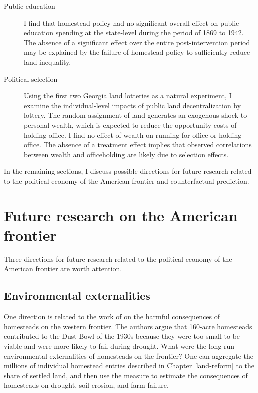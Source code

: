 \begin{description}
	\item[Public education] I find that homestead policy had no significant overall effect on public education spending at the state-level during the period of 1869 to 1942. The absence of a significant effect over the entire post-intervention period may be explained by the failure of homestead policy to sufficiently reduce land inequality. 
	
	\item[Political selection] Using the first two Georgia land lotteries as a natural experiment, I examine the individual-level impacts of public land decentralization by lottery. The random assignment of land generates an exogenous shock to personal wealth, which is expected to reduce the opportunity costs of holding office. I find no effect of wealth on running for office or holding office. The absence of a treatment effect implies that observed  correlations between wealth and officeholding are likely due to selection effects.
	
\end{description}

In the remaining sections, I discuss possible directions for future research related to the political economy of the American frontier and counterfactual prediction. 

\section{Future research on the American frontier}

Three directions for future research related to the political economy of the American frontier are worth attention. 

\subsection{Environmental externalities} One direction is related to the work of \citet{hansen2001us} on the harmful consequences of homesteads on the western frontier. The authors argue that 160-acre homesteads contributed to the Dust Bowl of the 1930s because they were too small to be viable and were more likely to fail during drought. What were the long-run environmental externalities of homesteads on the frontier? One can aggregate the millions of individual homestead entries described in Chapter \ref{land-reform} to the share of settled land, and then use the measure to estimate the consequences of homesteads on drought, soil erosion, and farm failure. 

